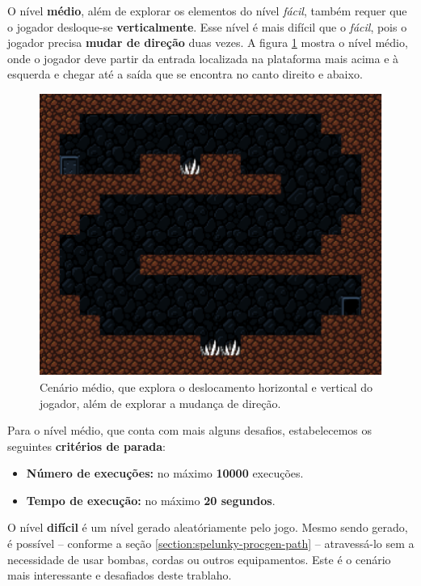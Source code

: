 O nível \textbf{médio}, além de explorar os elementos do nível \textit{fácil},
também requer que o jogador desloque-se \textbf{verticalmente}. Esse nível é
mais difícil que o \textit{fácil}, pois o jogador precisa \textbf{mudar de
direção} duas vezes. A figura \ref{fig:level2} mostra o nível médio, onde o
jogador deve partir da entrada localizada na plataforma mais acima e à
esquerda e chegar até a saída que se encontra no canto direito e abaixo.

\begin{figure}[H]
\centering
\includegraphics[width=\textwidth / 2]{fig/levels/level2.pdf}
\caption{Cenário médio, que explora o deslocamento horizontal e vertical do
    jogador, além de explorar a mudança de direção.}
\label{fig:level2}
\end{figure}

Para o nível médio, que conta com mais alguns desafios, estabelecemos os
seguintes \textbf{critérios de parada}:

\begin{itemize}
	\item \textbf{Número de execuções:} no máximo \textbf{10000} execuções.
	\item \textbf{Tempo de execução:} no máximo \textbf{20 segundos}.
\end{itemize}

O nível \textbf{difícil} é um nível gerado aleatóriamente pelo jogo. Mesmo sendo
gerado, é possível -- conforme a seção \ref{section:spelunky-procgen-path} --
atravessá-lo sem a necessidade de usar bombas, cordas ou outros equipamentos.
Este é o cenário mais interessante e desafiados deste trablaho.

